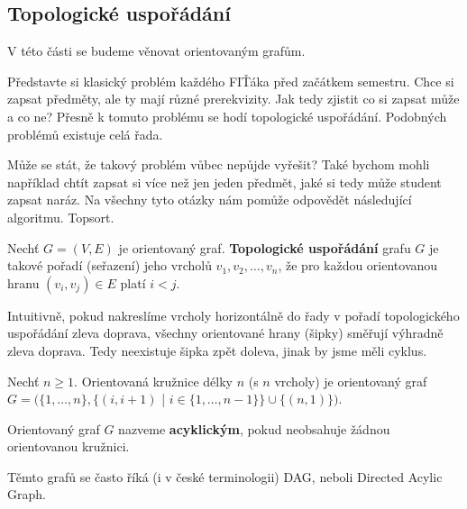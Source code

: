 \subsection{Topologické uspořádání}

V této části se budeme věnovat orientovaným grafům.

\noindent Představte si klasický problém každého FIŤáka před začátkem semestru. Chce si zapsat předměty, ale ty mají různé prerekvizity. Jak tedy zjistit co si zapsat může a co ne? Přesně k tomuto problému se hodí topologické uspořádání. Podobných problémů existuje celá řada. 

\noindent Může se stát, že takový problém vůbec nepůjde vyřešit? Také bychom mohli například chtít zapsat si více než jen jeden předmět, jaké si tedy může student zapsat naráz. Na všechny tyto otázky nám pomůže odpovědět následující algoritmu. Topsort. \bigskip


\begin{definition}
Nechť $G = (V, E)$ je orientovaný graf. \textbf{Topologické uspořádání} grafu $G$ je takové pořadí (seřazení) jeho vrcholů $v_1, v_2, \dots, v_n$, že pro každou orientovanou hranu $(v_i, v_j) \in E$ platí $i < j$.
\end{definition}

\noindent Intuitivně, pokud nakreslíme vrcholy horizontálně do řady v pořadí topologického uspořádání zleva doprava, všechny orientované hrany (šipky) směřují výhradně zleva doprava. Tedy neexistuje šipka zpět doleva, jinak by jsme měli cyklus.



\begin{definition}
Nechť $n \geq 1$. Orientovaná kružnice délky $n$ (s $n$ vrcholy) je orientovaný graf $G = (\{1, \dots , n\}, \{(i, i + 1)$ | $i \in \{1, \dots , n - 1\}\} \cup \{(n, 1)\})$.
\end{definition} \medskip



\begin{definition}
Orientovaný graf $G$ nazveme \textbf{acyklickým}, pokud neobsahuje žádnou orientovanou kružnici.
\end{definition}

\medskip

\begin{remark}
    Těmto grafů se často říká (i v české terminologii) DAG, neboli Directed Acylic Graph.
\end{remark} 

